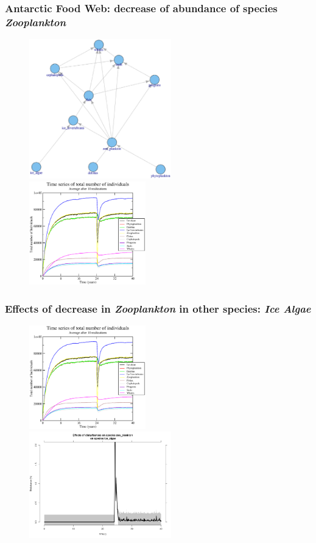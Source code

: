 \documentclass[xcolor=x11names,compress]{beamer}
\renewcommand{\(}{\begin{columns}}
\renewcommand{\)}{\end{columns}}
\newcommand{\<}[1]{\begin{column}{#1}}
\renewcommand{\>}{\end{column}}
\begin{document}
\begin{frame}
\frametitle{Antarctic Food Web: decrease of abundance of species \emph{Zooplankton}}
\begin{figure}
 \includegraphics[width=0.55\textwidth]{./figures/antfigures/Antarctic_fweb.eps} 
 \includegraphics[width=0.45\textwidth]{./figures/antfigures/ant_dec05.eps} 
\end{figure}
\end{frame}

\begin{frame}
\frametitle{Effects of decrease in \emph{Zooplankton} in other species: \emph{Ice Algae}}
\begin{figure}
 \includegraphics[width=0.45\textwidth]{./figures/antfigures/ant_dec05.eps} 
 \includegraphics[width=0.55\textwidth]{./figures/antfigures/ant_stdevperkins_dec05_species_sp1}
\end{figure}
\end{frame}
\end{document}
